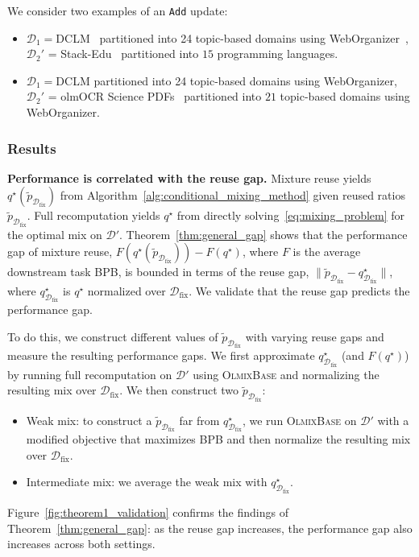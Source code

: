 \documentclass[table]{ai2style/ai2}
\newcommand{\D}[0]{\mathcal{D}}
\newcommand{\Dfix}[0]{\mathcal{D}_{\text{fix}}}
\newcommand{\base}[0]{\textsc{OlmixBase}\xspace}
\newcommand{\Add}[0]{\texttt{Add}\xspace}
\begin{document}
We consider two examples of an \Add update:
\begin{itemize}
    \item $\D_1=$DCLM~\citep{dclm} partitioned into 24 topic-based domains using WebOrganizer~\citep{wettig2025organizewebconstructingdomains}, $\D_2'$ = Stack-Edu~\citep{allal2025smollm2smolgoesbig} partitioned into $15$ programming languages.
    \item $\D_1=$DCLM partitioned into 24 topic-based domains using WebOrganizer, $\D_2'$ = olmOCR Science PDFs~\citep{olmo2025olmo3} partitioned into $21$ topic-based domains using WebOrganizer. 
\end{itemize}

\subsubsection{Results}\label{sec:validation_results}

\textbf{Performance is correlated with the reuse gap.} 
Mixture reuse yields $q^\star(\tilde{p}_{\Dfix})$ from Algorithm~\ref{alg:conditional_mixing_method} given reused ratios $\tilde{p}_{\Dfix}$. Full recomputation yields $q^\star$ from directly solving~\eqref{eq:mixing_problem} for the optimal mix on $\D'$.
Theorem~\ref{thm:general_gap} shows that the performance gap of mixture reuse, $F(q^\star(\tilde{p}_{\Dfix})) - F(q^\star)$, where $F$ is the average downstream task BPB, is bounded in terms of the reuse gap, $\|\tilde{p}_{\Dfix} - q_{\Dfix}^\star \|$, where $q_{\Dfix}^\star$ is $q^\star$ normalized over $\Dfix$. We validate that the reuse gap predicts the performance gap.

To do this, we construct different values of $\tilde{p}_{\Dfix}$ with varying reuse gaps and measure the resulting performance gaps.
We first approximate $q_{\Dfix}^\star$ (and $F(q^\star)$) by running full recomputation on $\D'$ using \base and normalizing the resulting mix over $\Dfix$. 
We then construct two $\tilde{p}_{\Dfix}$:
\begin{itemize}
    \item Weak mix: to construct a $\tilde{p}_{\Dfix}$ far from $q^\star_{\Dfix}$, we run \base on $\D'$ with a modified objective that maximizes BPB and then normalize the resulting mix over $\Dfix$.
    \item Intermediate mix: we average the weak mix with $q^\star_{\Dfix}$.
\end{itemize}

Figure~\ref{fig:theorem1_validation} confirms the findings of Theorem~\ref{thm:general_gap}: as the reuse gap increases, the performance gap also increases across both settings.
\end{document}
